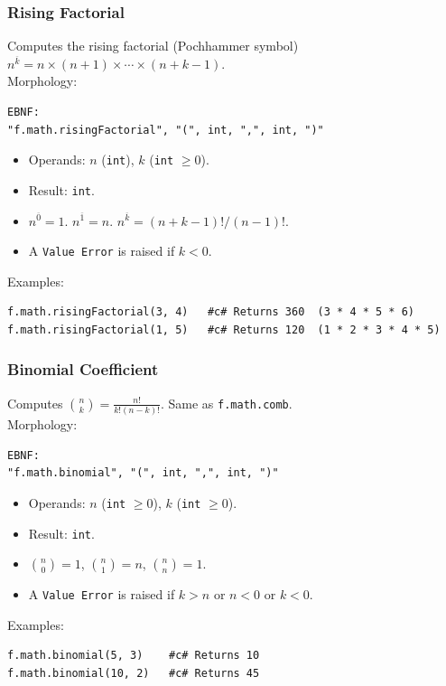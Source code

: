 \subsubsection{Rising Factorial}
Computes the rising factorial (Pochhammer symbol) $n^{\overline{k}} = n \times (n+1) \times \cdots \times (n+k-1)$. \\
Morphology:
\begin{verbatim}
EBNF:
"f.math.risingFactorial", "(", int, ",", int, ")"
\end{verbatim}
\begin{itemize}
\item Operands: $n$ (\texttt{int}), $k$ (\texttt{int} $\geq 0$).
\item Result: \texttt{int}.
\item $n^{\overline{0}} = 1$. $n^{\overline{1}} = n$. $n^{\overline{k}} = (n+k-1)! / (n-1)!$.
\item A \texttt{Value Error} is raised if $k < 0$.
\end{itemize}
Examples:
\begin{verbatim}
f.math.risingFactorial(3, 4)   #c# Returns 360  (3 * 4 * 5 * 6)
f.math.risingFactorial(1, 5)   #c# Returns 120  (1 * 2 * 3 * 4 * 5)
\end{verbatim}

\subsubsection{Binomial Coefficient}
Computes $\binom{n}{k} = \frac{n!}{k!(n-k)!}$. Same as \texttt{f.math.comb}. \\
Morphology:
\begin{verbatim}
EBNF:
"f.math.binomial", "(", int, ",", int, ")"
\end{verbatim}
\begin{itemize}
\item Operands: $n$ (\texttt{int} $\geq 0$), $k$ (\texttt{int} $\geq 0$).
\item Result: \texttt{int}.
\item $\binom{n}{0} = 1$, $\binom{n}{1} = n$, $\binom{n}{n} = 1$.
\item A \texttt{Value Error} is raised if $k > n$ or $n < 0$ or $k < 0$.
\end{itemize}
Examples:
\begin{verbatim}
f.math.binomial(5, 3)    #c# Returns 10
f.math.binomial(10, 2)   #c# Returns 45
\end{verbatim}

